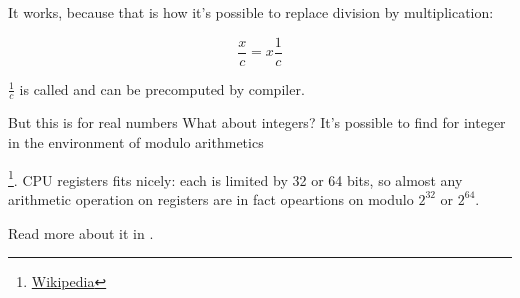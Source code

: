It works, because that is how it's possible to replace division by multiplication:

\[
	\frac{x}{c} = x\frac{1}{c}
\]

$\frac{1}{c}$ is called  and can be precomputed by compiler.

But this is for real numbers
What about integers?
It's possible to find  for integer in the environment of modulo arithmetics

\footnote{\href{http://go.yurichev.com/17359}{Wikipedia}}.
\ac{CPU} registers fits nicely: each is limited by 32 or 64 bits, so almost any arithmetic operation on registers are in fact
opeartions on modulo $2^{32}$ or $2^{64}$.

Read more about it in .

